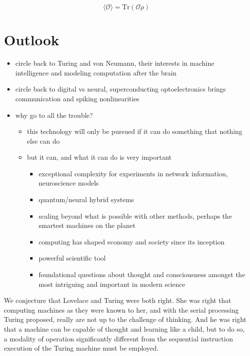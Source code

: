 \documentclass[twocolumn]{article}
\begin{document}
\begin{equation}
\label{eq:density_matrix}
\langle \mathcal{O}\rangle = \mathrm{Tr}(\mathcal{O}\rho)
\end{equation}


\section{\label{sec:outlook}Outlook}

\begin{itemize}

\item circle back to Turing and von Neumann, their interests in machine intelligence and modeling computation after the brain
\item circle back to digital vs neural, superconducting optoelectronics brings communication and spiking nonlinearities

\item why go to all the trouble?
\begin{itemize}
\item this technology will only be pursued if it can do something that nothing else can do
\item but it can, and what it can do is very important
\begin{itemize}
\item exceptional complexity for experiments in network information, neuroscience models
\item quantum/neural hybrid systems
\item scaling beyond what is possible with other methods, perhaps the smartest machines on the planet
\item computing has shaped economy and society since its inception
\item powerful scientific tool
\item foundational questions about thought and consciousness amongst the most intriguing and important in modern science
\end{itemize}

\end{itemize}

\end{itemize}

\vspace{3em}
We conjecture that Lovelace and Turing were both right. She was right that computing machines as they were known to her, and with the serial processing Turing proposed, really are not up to the challenge of thinking. And he was right that a machine can be capable of thought and learning like a child, but to do so, a modality of operation significantly different from the sequential instruction execution of the Turing machine must be employed.
\end{document}

